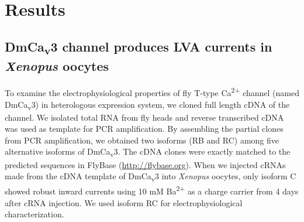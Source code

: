 \section*{Results}

\subsection*{DmCa\textsubscript{v}3 channel produces LVA currents in \emph{Xenopus} oocytes}

To examine the electrophysiological properties of fly T-type Ca\textsuperscript{2+} channel (named DmCa\textsubscript{v}3) in heterologous expression system, we cloned full length cDNA of the channel.
We isolated total RNA from fly heads and reverse transcribed cDNA was used as template for PCR amplification.
By assembling the partial clones from PCR amplification, we obtained two isoforms (RB and RC) among five alternative isoforms of DmCa\textsubscript{v}3. The cDNA clones were exactly matched to the predicted sequences in FlyBase (\href{http://}{http://flybase.org}).
When we injected cRNAs made from the cDNA template of DmCa\textsubscript{v}3 into \emph{Xenopus} oocytes, only isoform C showed robust inward currents using 10 mM Ba\textsuperscript{2+} as a charge carrier from 4 days after cRNA injection. 
We used isoform RC for electrophysiological characterization.

